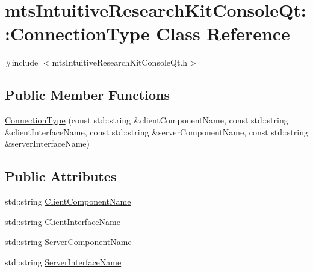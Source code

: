\hypertarget{classmts_intuitive_research_kit_console_qt_1_1_connection_type}{\section{mts\-Intuitive\-Research\-Kit\-Console\-Qt\-:\-:Connection\-Type Class Reference}
\label{classmts_intuitive_research_kit_console_qt_1_1_connection_type}
}


{\ttfamily \#include $<$mts\-Intuitive\-Research\-Kit\-Console\-Qt.\-h$>$}

\subsection*{Public Member Functions}
\begin{DoxyCompactItemize}
\item 
\hyperlink{classmts_intuitive_research_kit_console_qt_1_1_connection_type_a06392bce185d53ccc038dd34e9e79d13}{Connection\-Type} (const std\-::string \&client\-Component\-Name, const std\-::string \&client\-Interface\-Name, const std\-::string \&server\-Component\-Name, const std\-::string \&server\-Interface\-Name)
\end{DoxyCompactItemize}
\subsection*{Public Attributes}
\begin{DoxyCompactItemize}
\item 
std\-::string \hyperlink{classmts_intuitive_research_kit_console_qt_1_1_connection_type_a988c642d883289fa351127f8a661f53b}{Client\-Component\-Name}
\item 
std\-::string \hyperlink{classmts_intuitive_research_kit_console_qt_1_1_connection_type_ada2ba37b4e63d348570722a44e14271c}{Client\-Interface\-Name}
\item 
std\-::string \hyperlink{classmts_intuitive_research_kit_console_qt_1_1_connection_type_a2f78af1f8a6f2548a52e640bd8d6112a}{Server\-Component\-Name}
\item 
std\-::string \hyperlink{classmts_intuitive_research_kit_console_qt_1_1_connection_type_af86c8637107c8f695e93f4d0548b61fb}{Server\-Interface\-Name}
\end{DoxyCompactItemize}


